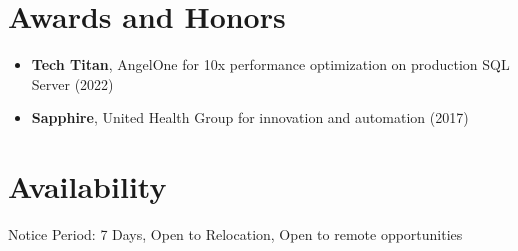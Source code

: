 \documentclass[10pt,a4paper]{article}
\begin{document}
\section{Awards and Honors}
\begin{itemize}
  \item \textbf{Tech Titan}, AngelOne for 10x performance optimization on production SQL Server (2022)
  \item \textbf{Sapphire}, United Health Group for innovation and automation (2017)
\end{itemize}

\section{Availability}
Notice Period: 7 Days, Open to Relocation, Open to remote opportunities
\end{document}
